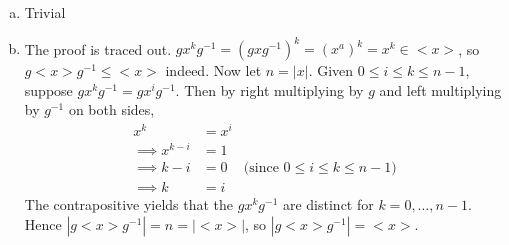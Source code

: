 \documentclass{article}
\newcommand{\inv}[1]{ {#1}^{-1} }
\newcommand{\norm}[1]{|#1|}
\newcommand{\cyclic}[1]{<#1>}
\begin{document}
\subsubsection{}\label{ex3p21}
\subsubsection{}\label{ex3p22}
\subsubsection{}\label{ex3p23}
\subsubsection{}\label{ex3p24}
\begin{enumerate}[(a)]
\item Trivial
\item The proof is traced out. $gx^k\inv{g}=(gx\inv{g})^k = (x^a)^k = x^k \in \cyclic{x}$, so $g\cyclic{x}\inv{g} \leq \cyclic{x}$ indeed. Now let $n=\norm{x}$. Given $0 \leq i \leq k \leq n-1$, suppose $gx^k\inv{g} = gx^i\inv{g}$. Then by right multiplying by $g$ and left multiplying by $\inv{g}$ on both sides,
\begin{align*}
x^k &= x^i\\
\implies x^{k-i} &= 1\\
\implies k-i &= 0 & \mbox{(since $0\leq i\leq k\leq n-1$)}\\
\implies k &= i
\end{align*}
The contrapositive yields that the $gx^k\inv{g}$ are distinct for $k=0,\ldots,n-1$. Hence $\norm{g\cyclic{x}\inv{g}} = n = \norm{\cyclic{x}}$, so $\norm{g\cyclic{x}\inv{g}} = \cyclic{x}$.
\end{enumerate}
\end{document}
